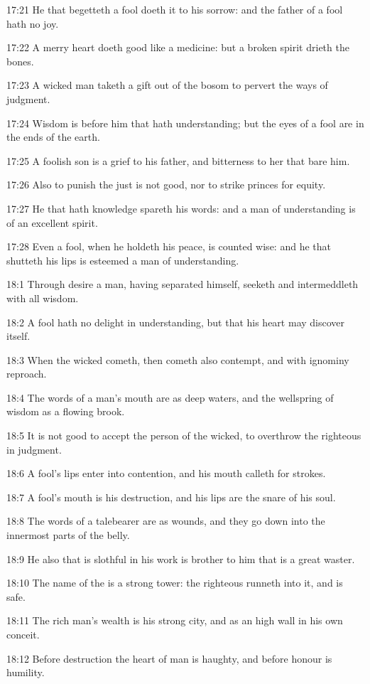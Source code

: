 17:21 He that begetteth a fool doeth it to his sorrow: and the father of a fool hath no joy.

17:22 A merry heart doeth good like a medicine: but a broken spirit drieth the bones.

17:23 A wicked man taketh a gift out of the bosom to pervert the ways of judgment.

17:24 Wisdom is before him that hath understanding; but the eyes of a fool are in the ends of the earth.

17:25 A foolish son is a grief to his father, and bitterness to her that bare him.

17:26 Also to punish the just is not good, nor to strike princes for equity.

17:27 He that hath knowledge spareth his words: and a man of understanding is of an excellent spirit.

17:28 Even a fool, when he holdeth his peace, is counted wise: and he that shutteth his lips is esteemed a man of understanding.

18:1 Through desire a man, having separated himself, seeketh and intermeddleth with all wisdom.

18:2 A fool hath no delight in understanding, but that his heart may discover itself.

18:3 When the wicked cometh, then cometh also contempt, and with ignominy reproach.

18:4 The words of a man's mouth are as deep waters, and the wellspring of wisdom as a flowing brook.

18:5 It is not good to accept the person of the wicked, to overthrow the righteous in judgment.

18:6 A fool's lips enter into contention, and his mouth calleth for strokes.

18:7 A fool's mouth is his destruction, and his lips are the snare of his soul.

18:8 The words of a talebearer are as wounds, and they go down into the innermost parts of the belly.

18:9 He also that is slothful in his work is brother to him that is a great waster.

18:10 The name of the \LORD is a strong tower: the righteous runneth into it, and is safe.

18:11 The rich man's wealth is his strong city, and as an high wall in his own conceit.

18:12 Before destruction the heart of man is haughty, and before honour is humility.

